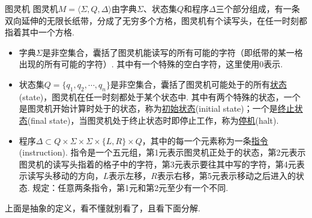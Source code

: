 \begin{definition}{图灵机}
    图灵机\(M = \langle \Sigma, Q, \Delta \rangle\)由字典\(\Sigma\)、状态集\(Q\)和程序\(\Delta\)三个部分组成，有一条双向延伸的无限长纸带，分成了无穷多个方格，图灵机有个读写头，在任一时刻都指着其中一个方格.
    \begin{itemize}
        \item 字典\(\Sigma\)是非空集合，囊括了图灵机能读写的所有可能的字符（即纸带的某一格出现的所有可能的字符）. 其中有一个特殊的空白字符，这里使用\(0\)表示. 
        \item 状态集\(Q=\{q_1, q_2, \cdots, q_n\}\)是非空集合，囊括了图灵机可能处于的所有\underline{状态}(state)，图灵机在任一时刻都处于某个状态中. 其中有两个特殊的状态，一个是图灵机开始计算时处于的状态，称为\underline{初始状态}(initial state)；一个是\underline{终止状态}(final state)，当图灵机处于终止状态时即停止工作，称为\underline{停机}(halt).
        \item 程序\(\Delta \subset Q \times \Sigma \times \Sigma \times \{L,R\} \times Q\)，其中的每一个元素称为一条\underline{指令}(instruction). 指令是一个五元组，第1元表示图灵机正处于的状态，第2元表示图灵机的读写头指着的格子中的字符，第3元表示要往其中写的字符，第4元表示读写头移动的方向，\(L\)表示左移，\(R\)表示右移，第5元表示移动之后进入的状态. 规定：任意两条指令，第1元和第2元至少有一个不同.
    \end{itemize}
\end{definition}

上面是抽象的定义，看不懂就别看了，且看下面分解.

